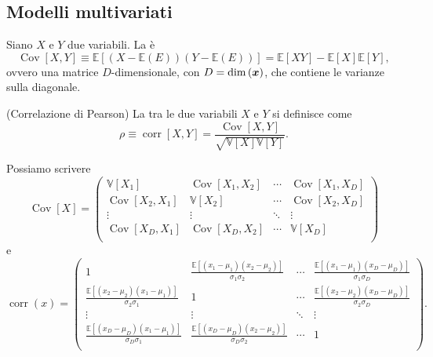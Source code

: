 \documentclass[10pt]{article}
\DeclareMathOperator{\Cov}{Cov}
\DeclareMathOperator{\corr}{corr}
\newcommand{\pare}[1]{
	\ensuremath{\left(#1\right)}
}
\newcommand{\spare}[1]{
	\ensuremath{\left[#1\right]}
}
\begin{document}
\subsection{Modelli multivariati}
\begin{definition}[Covarianza]
Siano $X$ e $Y$ due variabili. La  è
\begin{equation}
\Cov\spare{X, Y} \equiv \mathbb{E}\spare{\pare{X - \mathbb{E}\pare{E}}\pare{Y - \mathbb{E}\pare{E}}} = \mathbb{E}\spare{XY} - \mathbb{E}\spare{X}\mathbb{E}\spare{Y},
\end{equation}
ovvero una matrice $D$-dimensionale, con $D = \dim\pare{\ve{x}}$, che contiene le varianze sulla diagonale.
\end{definition}

\begin{definition}(Correlazione di Pearson)
La  tra le due variabili $X$ e $Y$ si definisce come
\begin{equation}
\rho \equiv \corr\spare{X, Y} = \frac{\Cov\spare{X, Y}}{\sqrt{\mathbb{V}\spare{X}\mathbb{V}\spare{Y}}}.
\end{equation}
\end{definition}

Possiamo scrivere
\begin{equation}
\Cov\spare{X} = \pare{\begin{array}{cccc}
\mathbb{V}\spare{X_1} & \Cov\spare{X_1, X_2} & \cdots & \Cov\spare{X_1, X_D} \\
\Cov\spare{X_2, X_1} & \mathbb{V}\spare{X_2} & \cdots & \Cov\spare{X_2, X_D} \\
\vdots & \vdots & \ddots & \vdots \\
\Cov\spare{X_D, X_1} & \Cov\spare{X_D, X_2} & \cdots & \mathbb{V}\spare{X_D} \\
\end{array}}
\end{equation}
e
\begin{equation}
\corr\pare{x} = \pare{\begin{array}{cccc}
1 & \frac{\mathbb{E}\spare{\pare{x_1-\mu_1}\pare{x_2-\mu_2}}}{\sigma_1\sigma_2} & \cdots & \frac{\mathbb{E}\spare{\pare{x_1-\mu_1}\pare{x_D-\mu_D}}}{\sigma_1\sigma_D} \\
\frac{\mathbb{E}\spare{\pare{x_2-\mu_2}\pare{x_1-\mu_1}}}{\sigma_2\sigma_1} & 1 & \cdots & \frac{\mathbb{E}\spare{\pare{x_2-\mu_2}\pare{x_D-\mu_D}}}{\sigma_2\sigma_D} \\
\vdots & \vdots & \ddots & \vdots \\
\frac{\mathbb{E}\spare{\pare{x_D-\mu_D}\pare{x_1-\mu_1}}}{\sigma_D\sigma_1} & \frac{\mathbb{E}\spare{\pare{x_D-\mu_D}\pare{x_2-\mu_2}}}{\sigma_D\sigma_2} & \cdots & 1 \\
\end{array}}.
\end{equation}
\end{document}
